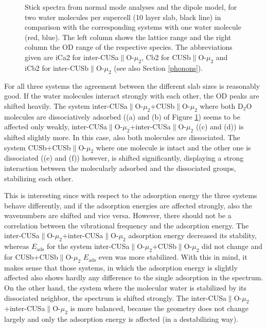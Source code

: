 \documentclass[11pt,DIV=13,BCOR=5mm,a4paper,headinclude]{scrbook}
\begin{document}
\begin{figure}[!h]
             \quad
{}
\caption{Stick spectra from normal mode analyses and the dipole model, for two water molecules per supercell (10 layer slab, black line) in comparison with the corresponding systems with one water molecule (red, blue).
The left column shows the lattice range and the right column the OD range of the respective species.
The abbreviations given are iCa2 for inter-CUSa$\parallel$O-$\mu_2$, Cb2 for CUSb$\parallel$O-$\mu_2$ and iCb2 for inter-CUSb$\parallel$O-$\mu_2$ (see also Section \ref{phonons}).}
            \label{abb:2water_comp}
\end{figure}
For all three systems the agreement between the different slab sizes is reasonably good.
If the water molecules interact strongly with each other, the OD peaks are shifted heavily.
The system inter-CUSa$\parallel$O-$\mu_2$+CUSb$\parallel$O-$\mu_2$ where both D$_2$O molecules are dissociatively adsorbed ((a) and (b) of Figure \ref{abb:2water_comp}) seems to be affected only weakly, inter-CUSa$\parallel$O-$\mu_2$+inter-CUSa$\parallel$O-$\mu_2$ ((c) and (d)) is shifted slightly more.
In this case, also both molecules are dissociated.
The system CUSb+CUSb$\parallel$O-$\mu_2$ where one molecule is intact and the other one is dissociated ((e) and (f)) however, is shifted  significantly, displaying a strong interaction between the molecularly adsorbed and the dissociated groups, stabilizing each other.

This is interesting since with respect to the adsorption energy the three systems behave differently, and if the adsorption energies are affected strongly, also the wavenumbers are shifted and vice versa.
However, there should not be a correlation between the vibrational frequency and the adsorption energy.
The inter-CUSa$\parallel$O-$\mu_2$+inter-CUSa$\parallel$O-$\mu_2$ adsorption energy decreased its stability, whereas $E_\textrm{ads}$ for the system inter-CUSa$\parallel$O-$\mu_2$+CUSb$\parallel$O-$\mu_2$ did not change and for CUSb+CUSb$\parallel$O-$\mu_2$ $E_\textrm{ads}$ even was more stabilized.
With this in mind, it makes sense that those systems, in which the adsorption energy is slightly affected also shows hardly any difference to the single adsorption in the spectrum.
On the other hand, the system where the molecular water is stabilized by its dissociated neighbor, the spectrum is shifted strongly.
The inter-CUSa$\parallel$O-$\mu_2$+inter-CUSa$\parallel$O-$\mu_2$ is more balanced, because the geometry does not change largely and only the adsorption energy is affected (in a destabilizing way).
\end{document}
